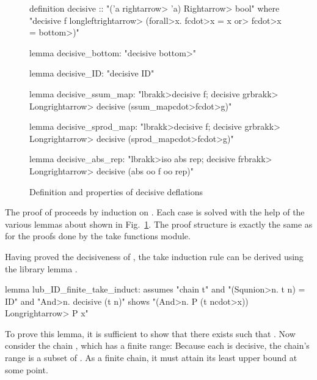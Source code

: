 \begin{figure}
\begin{isacode}
definition decisive :: "('a \<rightarrow> 'a) \<Rightarrow> bool"
  where "decisive f \<longleftrightarrow> (\<forall>x. f\<cdot>x = x \<or> f\<cdot>x = \<bottom>)"
\end{isacode}
\unmedskip
{}
\begin{isacode}
lemma decisive_bottom: "decisive \<bottom>"
\end{isacode}
\unmedskip
{}
\begin{isacode}
lemma decisive_ID: "decisive ID"
\end{isacode}
\unmedskip
{}
\begin{isacode}
lemma decisive_ssum_map: "\<lbrakk>decisive f; decisive g\<rbrakk> \<Longrightarrow> decisive (ssum_map\<cdot>f\<cdot>g)"
\end{isacode}
\unmedskip
{}
\begin{isacode}
lemma decisive_sprod_map: "\<lbrakk>decisive f; decisive g\<rbrakk> \<Longrightarrow> decisive (sprod_map\<cdot>f\<cdot>g)"
\end{isacode}
\unmedskip
{}
\begin{isacode}
lemma decisive_abs_rep: "\<lbrakk>iso abs rep; decisive f\<rbrakk> \<Longrightarrow> decisive (abs oo f oo rep)"
\end{isacode}
\caption{Definition and properties of decisive deflations}
\label{fig:domain-decisive}
\end{figure}

The proof of  proceeds by induction on . Each case is solved with the help of the various lemmas about  shown in Fig.~\ref{fig:domain-decisive}. The proof structure is exactly the same as for the  proofs done by the take functions module.

Having proved the decisiveness of , the take induction rule can be derived using the library lemma .
%
\begin{isacode}
lemma lub_ID_finite_take_induct:
  assumes "chain t" and "(\<Squnion>n. t n) = ID" and "\<And>n. decisive (t n)"
  shows "(\<And>n. P (t n\<cdot>x)) \<Longrightarrow> P x"
\end{isacode}
%
To prove this lemma, it is sufficient to show that there exists  such that . Now consider the chain , which has a finite range: Because each  is decisive, the chain's range is a subset of . As a finite chain, it must attain its least upper bound at some point.

